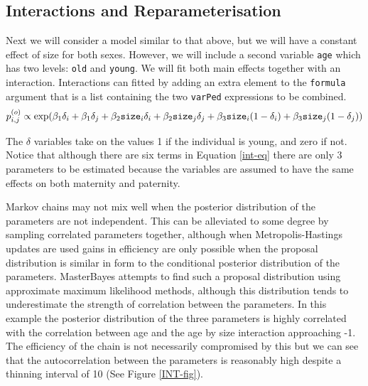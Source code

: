 \documentclass{article}
\begin{document}
\subsection{Interactions and Reparameterisation}

Next we will consider a model similar to that above, but we will have a constant effect of size for both sexes.  However, we will include a second variable \texttt{age} which has two levels: \texttt{old} and \texttt{young}. We will fit both main effects together with an interaction.  Interactions can fitted by adding an extra element to the \texttt{formula} argument that is a list containing the two \texttt{varPed} expressions to be combined.\\

\begin{equation}
p^{(o)}_{i,j} \propto \textrm{exp}(\beta_{1}\delta_{i}+\beta_{1}\delta_{j}+\beta_{2}\textrm{\texttt{size}}_{i}\delta_{i}+\beta_{2}\textrm{\texttt{size}}_{j}\delta_{j}+\beta_{3}\textrm{\texttt{size}}_{i}(1-\delta_{i})+\beta_{3}\textrm{\texttt{size}}_{j}(1-\delta_{j}))
\label{int-eq}
\end{equation}

The $\delta$ variables take on the values 1 if the individual is young, and zero if not.  Notice that although there are six terms in Equation \ref{int-eq} there are only 3 parameters to be estimated because the variables are assumed to have the same effects on both maternity and paternity.   


\begin{Schunk}
\end{Schunk}

Markov chains may not mix well when the posterior distribution of the parameters are not independent. This can be alleviated to some degree by sampling correlated parameters together, although when Metropolis-Hastings updates are used gains in efficiency are only possible when the proposal distribution is similar in form to the conditional posterior distribution of the parameters. MasterBayes attempts to find such a proposal distribution using approximate maximum likelihood methods, although this distribution tends to underestimate the strength of correlation between the parameters.  In this example the posterior distribution of the three parameters is highly correlated with the correlation between age and the age by size interaction approaching -1. The efficiency of the chain is not necessarily compromised by this but we can see that the autocorrelation between the parameters is reasonably high despite a thinning interval of 10 (See Figure \ref{INT-fig}).
\end{document}
